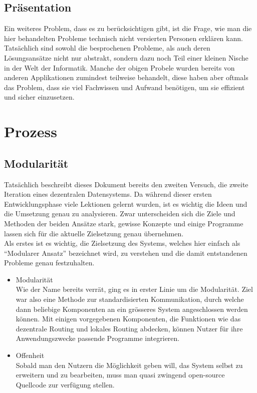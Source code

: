 \documentclass[11pt]{article}
\begin{document}
\subsection{Präsentation}
\label{sec:org9e95d8b}
Ein weiteres Problem, dass es zu berücksichtigen gibt, ist die Frage,
wie man die hier behandelten Probleme technisch nicht versierten
Personen erklären kann. Tatsächlich sind sowohl die besprochenen
Probleme, als auch deren Lösungsansätze nicht nur abstrakt, sondern
dazu noch Teil einer kleinen Nische in der Welt der Informatik.
Manche der obigen Probele wurden bereits von anderen Applikationen
zumindest teilweise behandelt, diese haben aber oftmals das Problem,
dass sie viel Fachwissen und Aufwand benötigen, um sie effizient und
sicher einzusetzen.
\section{Prozess}
\label{sec:org3cd0912}
\subsection{Modularität}
\label{sec:org6fecbcb}
Tatsächlich beschreibt dieses Dokument bereits den zweiten Versuch,
die zweite Iteration eines dezentralen Datensystems. Da während dieser
ersten Entwicklungsphase viele Lektionen gelernt wurden, ist es
wichtig die Ideen und die Umsetzung genau zu analysieren. Zwar
unterscheiden sich die Ziele und Methoden der beiden Ansätze stark,
gewisse Konzepte und einige Programme lassen sich für die aktuelle
Zielsetzung genau übernehmen.\\

\noindent Als erstes ist es wichtig, die Zielsetzung des Systems,
welches hier einfach als “Modularer Ansatz” bezeichnet wird, zu
verstehen und die damit entstandenen Probleme genau festzuhalten.
\begin{itemize}
\item Modularität \\
Wie der Name bereits verrät, ging es in erster Linie um die
Modularität. Ziel war also eine Methode zur standardisierten
Kommunikation, durch welche dann beliebige Komponenten an ein
grösseres System angeschlossen werden können. Mit einigen
vorgegebenen Komponenten, die Funktionen wie das dezentrale Routing
und lokales Routing abdecken, können Nutzer für ihre
Anwendungszwecke passende Programme integrieren.
\item Offenheit \\
Sobald man den Nutzern die Möglichkeit geben will, das System selbst
zu erweitern und zu bearbeiten, muss man quasi zwingend open-source
Quellcode zur verfügung stellen.
\end{itemize}
\end{document}
